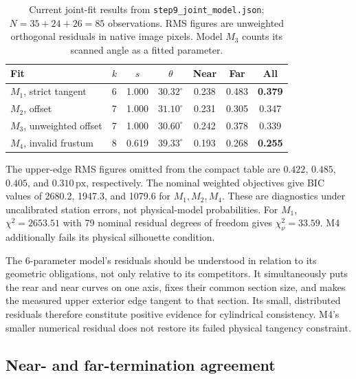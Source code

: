 \documentclass[11pt,letterpaper]{article}
\newcommand{\px}{\,\mathrm{px}}
\newcommand{\sourcepath}[1]{\nolinkurl{#1}}
\begin{document}
\begin{table}[ht]
\centering\small
\caption{Current joint-fit results from \sourcepath{step9_joint_model.json}; \(N=35+24+26=85\) observations. RMS figures are unweighted orthogonal residuals in native image pixels. Model \(M_3\) counts its scanned angle as a fitted parameter.}
\label{tab:joint}
\begin{tabularx}{\linewidth}{@{}l c c c c c c@{}}
\toprule
\textbf{Fit} & \(k\) & \(s\) & \(\theta\) & \textbf{Near} & \textbf{Far} & \textbf{All} \\
\midrule
\(M_1\), strict tangent & 6 & 1.000 & \(30.32^\circ\) & 0.238 & 0.483 & \textbf{0.379} \\
\(M_2\), offset & 7 & 1.000 & \(31.10^\circ\) & 0.231 & 0.305 & 0.347 \\
\(M_3\), unweighted offset & 7 & 1.000 & \(30.60^\circ\) & 0.242 & 0.378 & 0.339 \\
\(M_4\), invalid frustum & 8 & 0.619 & \(39.33^\circ\) & 0.193 & 0.268 & \textbf{0.255} \\
\bottomrule
\end{tabularx}
\vspace{4pt}
\begin{minipage}{0.96\linewidth}\footnotesize\color{slate}
The upper-edge RMS figures omitted from the compact table are \(0.422\), \(0.485\), \(0.405\), and \(0.310\px\), respectively. The nominal weighted objectives give BIC values of 2680.2, 1947.3, and 1079.6 for \(M_1,M_2,M_4\). These are diagnostics under uncalibrated station errors, not physical-model probabilities. For \(M_1\), \(\chi^2=2653.51\) with 79 nominal residual degrees of freedom gives \(\chi^2_\nu=33.59\). M4 additionally fails its physical silhouette condition.
\end{minipage}
\end{table}



The 6-parameter model's residuals should be understood in relation to its geometric obligations, not only relative to its competitors. It simultaneously puts the rear and near curves on one axis, fixes their common section size, and makes the measured upper exterior edge tangent to that section. Its small, distributed residuals therefore constitute positive evidence for cylindrical consistency. M4's smaller numerical residual does not restore its failed physical tangency constraint.

\subsection{Near- and far-termination agreement}
\end{document}
